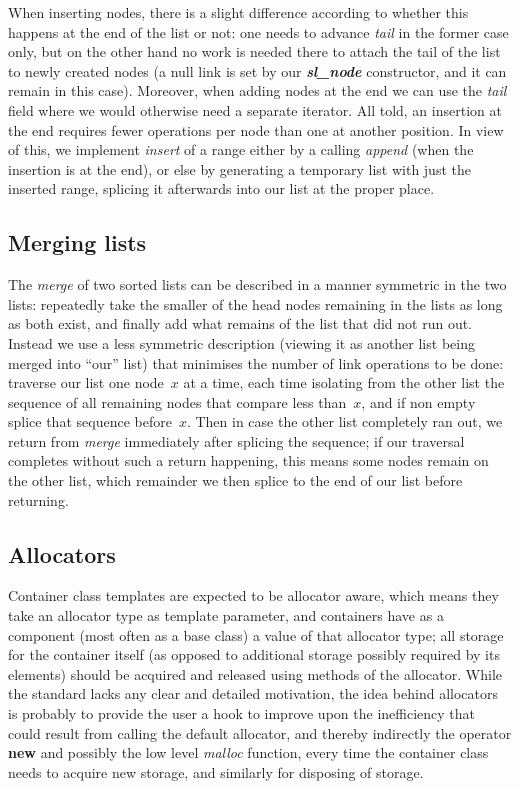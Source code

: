 \documentclass[12pt]{article}
\theoremstyle{plain}
\theoremstyle{definition}
\def\slnd.{\textbf{\textit{sl\_\!node}}}
\begin{document}
When inserting nodes, there is a slight difference according to whether this
happens at the end of the list or not: one needs to advance \textit{tail} in the
former case only, but on the other hand no work is needed there to attach the
tail of the list to newly created nodes (a null link is set by our \slnd.
constructor, and it can remain in this case). Moreover, when adding nodes at the
end we can use the \textit{tail} field where we would otherwise need a separate
iterator. All told, an insertion at the end requires fewer operations per node
than one at another position. In view of this, we implement \textit{insert} of a
range either by a calling \textit{append} (when the insertion is at the end), or
else by generating a temporary list with just the inserted range, splicing it
afterwards into our list at the proper place.

\subsection{Merging lists}

The \textit{merge} of two sorted lists can be described in a manner symmetric in
the two lists: repeatedly take the smaller of the head nodes remaining in the
lists as long as both exist, and finally add what remains of the list that did
not run out. Instead we use a less symmetric description (viewing it as another
list being merged into ``our'' list) that minimises the number of link
operations to be done: traverse our list one node~$x$ at a time, each time
isolating from the other list the sequence of all remaining nodes that compare
less than~$x$, and if non empty splice that sequence before~$x$. Then in case
the other list completely ran out, we return from \textit{merge} immediately
after splicing the sequence; if our traversal completes without such a return
happening, this means some nodes remain on the other list, which remainder we
then splice to the end of our list before returning.

\subsection{Allocators}

Container class templates are expected to be allocator aware, which means they
take an allocator type as template parameter, and containers have as a component
(most often as a base class) a value of that allocator type; all storage for the
container itself (as opposed to additional storage possibly required by its
elements) should be acquired and released using methods of the allocator. While
the standard lacks any clear and detailed motivation, the idea behind allocators
is probably to provide the user a hook to improve upon the inefficiency that
could result from calling the default allocator, and thereby indirectly the
operator \textbf{new} and possibly the low level \textit{malloc} function, every
time the container class needs to acquire new storage, and similarly for
disposing of storage.
\end{document}
